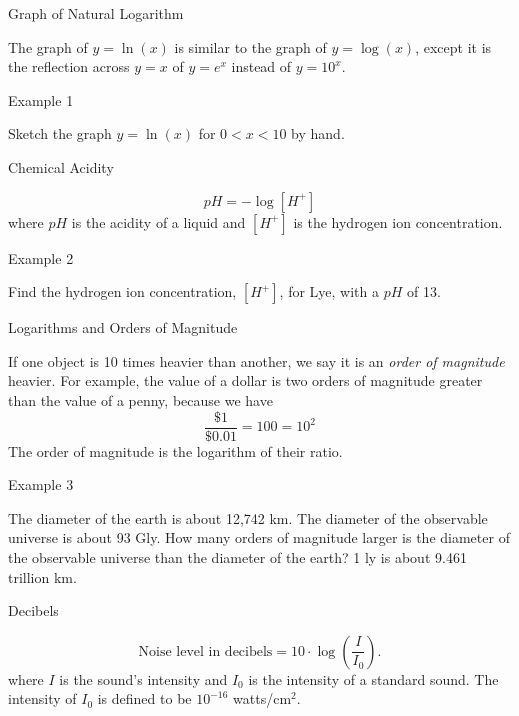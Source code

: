 \documentclass[ignorenonframetext,]{beamer}
\begin{document}
\begin{frame}{Graph of Natural Logarithm}

The graph of \(y = \ln(x)\) is similar to the graph of \(y = \log(x)\),
except it is the reflection across \(y = x\) of \(y = e^x\) instead of
\(y = 10^x\).

\end{frame}

\begin{frame}{Example 1}

Sketch the graph \(y = \ln(x)\) for \(0 < x < 10\) by hand.

\end{frame}

\begin{frame}{Chemical Acidity}

\[pH = -\log\left[H^+\right]\] where \(pH\) is the acidity of a liquid
and \(\left[H^+\right]\) is the hydrogen ion concentration.

\end{frame}

\begin{frame}{Example 2}

Find the hydrogen ion concentration, \(\left[H^+\right]\), for Lye, with
a \(pH\) of 13.

\end{frame}

\begin{frame}{Logarithms and Orders of Magnitude}

If one object is 10 times heavier than another, we say it is an
\emph{order of magnitude} heavier. For example, the value of a dollar is
two orders of magnitude greater than the value of a penny, because we
have \[\frac{\$1}{\$0.01} = 100 = 10^2\] The order of magnitude is the
logarithm of their ratio.

\end{frame}

\begin{frame}{Example 3}

The diameter of the earth is about 12,742 km. The diameter of the
observable universe is about 93 Gly. How many orders of magnitude larger
is the diameter of the observable universe than the diameter of the
earth? 1 ly is about 9.461 trillion km.

\end{frame}

\begin{frame}{Decibels}

\[\text{Noise level in decibels} = 10\cdot\log\left(\frac{I}{I_0}\right).\]
where \(I\) is the sound's intensity and \(I_0\) is the intensity of a
standard sound. The intensity of \(I_0\) is defined to be \(10^{-16}\)
watts/cm\(^2\).

\end{frame}
\end{document}
